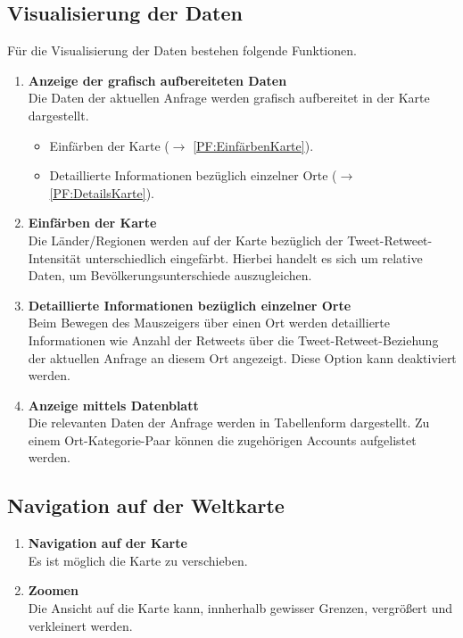 \subsection{Visualisierung der Daten}	
Für die Visualisierung der Daten bestehen folgende Funktionen.
\begin{enumerate}[ align=left, label={\textbf{\textbackslash F20\arabic*0\textbackslash}} ]	
	\item \textbf{Anzeige der grafisch aufbereiteten Daten} \label{PF:Visualisieren}\\
	Die Daten der aktuellen Anfrage werden grafisch aufbereitet in der Karte dargestellt.
	\begin{itemize}
		\item Einfärben der Karte ($\rightarrow$ \ref{PF:EinfärbenKarte}).
		\item Detaillierte Informationen bezüglich einzelner Orte ($\rightarrow$ \ref{PF:DetailsKarte}).
	\end{itemize}
	
	\item \textbf{Einfärben der Karte} \label{PF:EinfärbenKarte} \\
	Die Länder/Regionen werden auf der Karte bezüglich der Tweet-Retweet-Intensität unterschiedlich eingefärbt. Hierbei handelt es sich um relative Daten, um Bevölkerungsunterschiede auszugleichen.
	\item \textbf{Detaillierte Informationen bezüglich einzelner Orte} \label{PF:DetailsKarte} \\
	Beim Bewegen des Mauszeigers über einen Ort werden detaillierte Informationen wie Anzahl der Retweets über die Tweet-Retweet-Beziehung der aktuellen Anfrage an diesem Ort angezeigt. Diese Option kann deaktiviert werden.
	
	
	\item \textbf{Anzeige mittels Datenblatt} \label{PF:AnzeigeDatenblatt} \\
	Die relevanten Daten der Anfrage werden in Tabellenform dargestellt. Zu einem Ort-Kategorie-Paar können die zugehörigen Accounts aufgelistet werden.
	

\end{enumerate}

\subsection{Navigation auf der Weltkarte}
\begin{enumerate}[ align=left, label={\textbf{\textbackslash F30\arabic*0\textbackslash}} ]
	\item \textbf{Navigation auf der Karte} \label{PF:Navigation} \\
	Es ist möglich die Karte zu verschieben.
	\item \textbf{Zoomen} \label{PF:Zoomen} \\
	Die Ansicht auf die Karte kann, innherhalb gewisser Grenzen, vergrößert und verkleinert werden.
\end{enumerate}	
